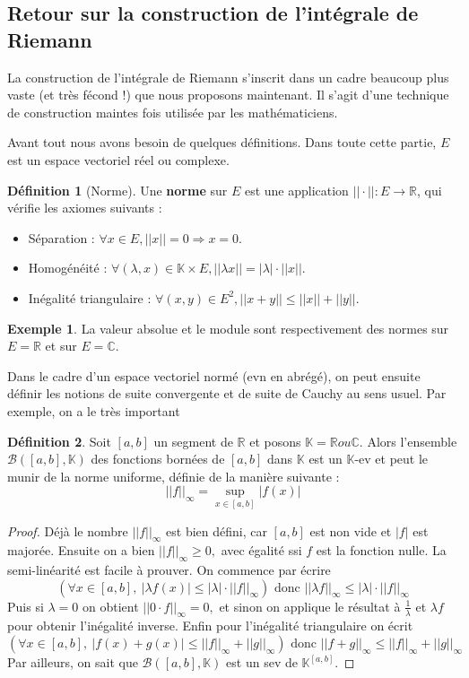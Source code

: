 \documentclass[french]{book}
\theoremstyle{plain}
\theoremstyle{definition}
\newtheorem{dfn}{Définition}[chapter]
\newtheorem{exa}{Exemple}[chapter]
\theoremstyle{remark}
\begin{document}
\subsection{Retour sur la construction de l'intégrale de Riemann}
La construction de l'intégrale de Riemann s'inscrit dans un cadre beaucoup plus vaste (et très fécond !) que nous proposons maintenant. Il s'agit d'une technique de construction maintes fois utilisée par les mathématiciens.\\ \par
Avant tout nous avons besoin de quelques définitions. Dans toute cette partie, $E$ est un espace vectoriel réel ou complexe.
\begin{dfn}[Norme]
	Une \textbf{norme} sur $E$ est une application $||\cdot|| : E \rightarrow \mathbb{R}$, qui vérifie les axiomes suivants :
\begin{itemize}
	\item Séparation : $\forall x \in E, ||x|| = 0 \Rightarrow x = 0$.
	\item Homogénéité : $\forall (\lambda, x) \in \mathbb{K} \times E, ||\lambda x|| = |\lambda| \cdot ||x||$.
	\item Inégalité triangulaire : $\forall (x, y) \in E^2, ||x+y|| \leqslant ||x|| + ||y||$.
\end{itemize}
\end{dfn}
\begin{exa}
	La valeur absolue et le module sont respectivement des normes sur $E = \mathbb{R}$ et sur $E = \mathbb{C}$.
\end{exa}
Dans le cadre d'un espace vectoriel normé (evn en abrégé), on peut ensuite définir les notions de suite convergente et de suite de Cauchy au sens usuel. Par exemple, on a le très important
\begin{dfn}
	Soit $[a, b]$ un segment de $\mathbb{R}$ et posons $\mathbb{K} = \mathbb{R} ou \mathbb{C}$. Alors l'ensemble $\mathcal{B}([a, b], \mathbb{K})$ des fonctions bornées de $[a, b]$ dans $\mathbb{K}$ est un $\mathbb{K}$-ev et peut le munir de la norme uniforme, définie de la manière suivante : $$||f||_{\infty} = \sup_{x \in [a, b]} |f(x)|$$
\end{dfn}
\begin{proof}
	Déjà le nombre $||f||_{\infty}$ est bien défini, car $[a, b]$ est non vide et $|f|$ est majorée. Ensuite on a bien $||f||_{\infty} \geqslant 0,$ avec égalité ssi $f$ est la fonction nulle. La semi-linéarité est facile à prouver. On commence par écrire $$\left(\forall x \in [a, b],\ |\lambda f(x)| \leqslant |\lambda| \cdot ||f||_{\infty}\right) \text{ donc } ||\lambda f||_{\infty} \leqslant |\lambda| \cdot ||f||_{\infty}$$
	Puis si $\lambda = 0$ on obtient $||0 \cdot f||_{\infty} = 0,$ et sinon on applique le résultat à $\frac{1}{\lambda}$ et $\lambda f$ pour obtenir l'inégalité inverse. Enfin pour l'inégalité triangulaire on écrit
	$$\left(\forall x \in [a, b],\ |f(x) + g(x)| \leqslant ||f||_{\infty} + ||g||_{\infty}\right) \text{ donc } ||f+g||_{\infty} \leqslant ||f||_{\infty} + ||g||_{\infty}$$
	Par ailleurs, on sait que $\mathcal{B}([a, b], \mathbb{K})$ est un sev de $\mathbb{K}^{[a, b]}$.
\end{proof}
\end{document}
